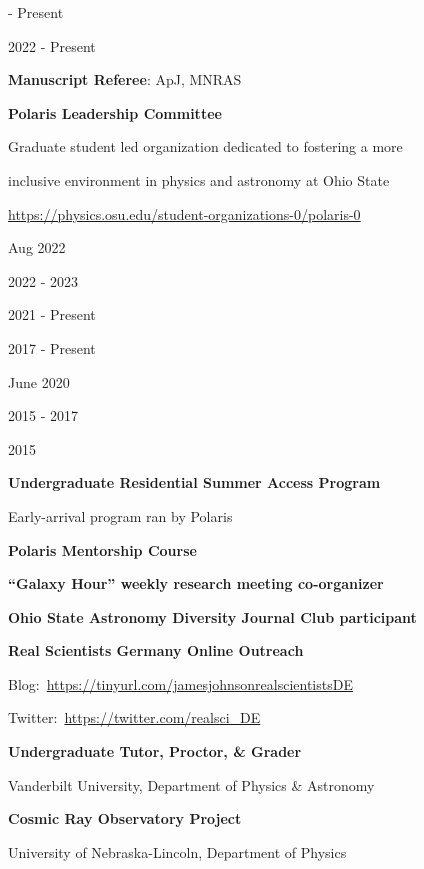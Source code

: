 \documentclass[cv.tex]{subfiles}
\begin{document}
\parbox{0.18\textwidth}{%
	 - Present \par
	2022 - Present \par
	\null \par
	\null \par
	\null \par
}
\hspace{1mm}
\parbox{0.8\textwidth}{%
	\vspace{1mm}
	\textbf{Manuscript Referee}: ApJ, MNRAS \par
	\textbf{Polaris Leadership Committee} \par
	Graduate student led organization dedicated to fostering a more \par
	inclusive environment in physics and astronomy at Ohio State \par
	\url{https://physics.osu.edu/student-organizations-0/polaris-0} \par
}

\noindent
\parbox{0.18\textwidth}{%
	\raggedleft
	Aug 2022 \par
	\null \par
	2022 - 2023 \par
	2021 - Present \par
	2017 - Present \par
	June 2020 \par
	\null \par
	\null \par
	2015 - 2017 \par
	\null \par
	2015 \par
	\null \par
}
\hspace{1mm}
\parbox{0.8\textwidth}{%
	\vspace{1mm}
	\textbf{Undergraduate Residential Summer Access Program} \par
	Early-arrival program ran by Polaris \par
	\textbf{Polaris Mentorship Course} \par
	\textbf{``Galaxy Hour'' weekly research meeting co-organizer} \par
	\textbf{Ohio State Astronomy Diversity Journal Club participant} \par
	\textbf{Real Scientists Germany Online Outreach} \par
	Blog:~\url{https://tinyurl.com/jamesjohnsonrealscientistsDE} \par
	Twitter:~\url{https://twitter.com/realsci_DE} \par
	\textbf{Undergraduate Tutor, Proctor, \& Grader} \par
	Vanderbilt University, Department of Physics \& Astronomy \par
	\textbf{Cosmic Ray Observatory Project} \par
	University of Nebraska-Lincoln, Department of Physics \par
}
\end{document}
